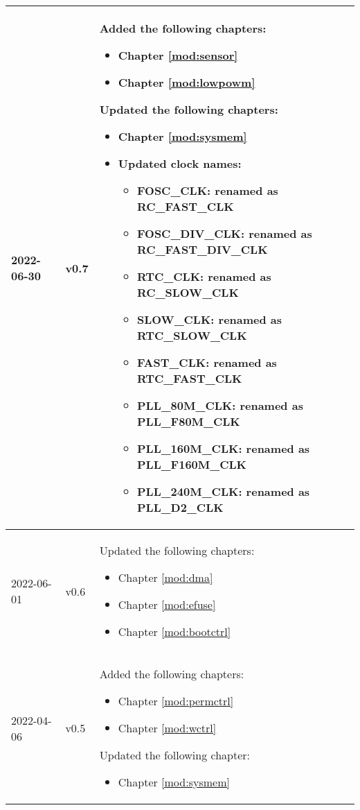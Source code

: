\begin{longtable}[l]{ | m{2cm} | m{1.5cm} | m{12cm} | }
    \\\hline
    2022-06-30     & v0.7  &
    Added the following chapters:
    \begin{itemize}
        \item Chapter \ref{mod:sensor} \textit{\nameref{mod:sensor}}
        \item Chapter \ref{mod:lowpowm} \textit{\nameref{mod:lowpowm}}
    \end{itemize}
    Updated the following chapters:
    \begin{itemize}
        \item Chapter \ref{mod:sysmem} \textit{\nameref{mod:sysmem}}
        \item Updated clock names:
        \begin{itemize}
        \item FOSC\_CLK: renamed as RC\_FAST\_CLK
        \item FOSC\_DIV\_CLK: renamed as RC\_FAST\_DIV\_CLK
        \item RTC\_CLK: renamed as RC\_SLOW\_CLK
        \item SLOW\_CLK: renamed as RTC\_SLOW\_CLK
        \item FAST\_CLK: renamed as RTC\_FAST\_CLK
        \item PLL\_80M\_CLK: renamed as PLL\_F80M\_CLK
        \item PLL\_160M\_CLK: renamed as PLL\_F160M\_CLK
        \item PLL\_240M\_CLK: renamed as PLL\_D2\_CLK%
    \end{itemize}
    \end{itemize}
    \\\hline
    2022-06-01     & v0.6  &
    Updated the following chapters:
    \begin{itemize}
        \item Chapter \ref{mod:dma} \textit{\nameref{mod:dma}}
        \item Chapter \ref{mod:efuse} \textit{\nameref{mod:efuse}} %
        \item Chapter \ref{mod:bootctrl} \textit{\nameref{mod:bootctrl}}
    \end{itemize}
    \\\hline
    2022-04-06     & v0.5  &
    Added the following chapters:
    \begin{itemize}
        \item Chapter \ref{mod:permctrl} \textit{\nameref{mod:permctrl}}
        \item Chapter \ref{mod:wctrl} \textit{\nameref{mod:wctrl}}
    \end{itemize}
    Updated the following chapter:
    \begin{itemize}
        \item Chapter \ref{mod:sysmem} \textit{\nameref{mod:sysmem}}
    \end{itemize}
    \\\hline


\end{longtable}
